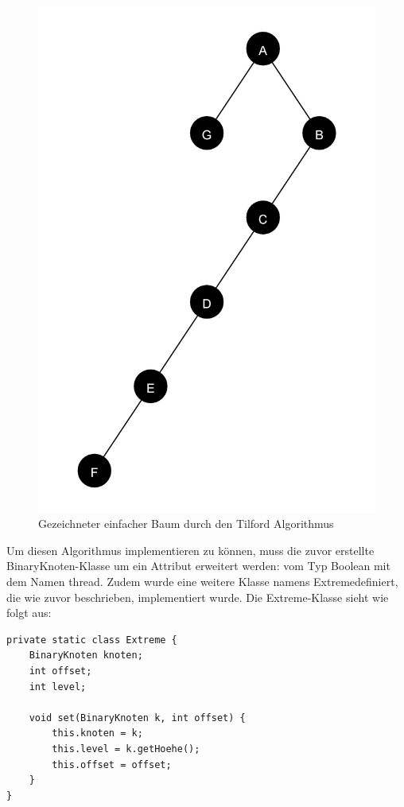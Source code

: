 \begin{figure}[H]
    \centering
    \includegraphics[scale = 0.07]{abbildungen/baum_algo_3_n2}
    \caption{Gezeichneter einfacher Baum durch den Tilford Algorithmus}
    \label{pic:baum_algo_3_n2} 
\end{figure}

Um diesen Algorithmus implementieren zu können, muss die zuvor erstellte BinaryKnoten-Klasse um ein 
Attribut erweitert werden: vom Typ Boolean mit dem Namen \glqq thread\grqq. Zudem wurde eine weitere Klasse 
namens \glqq Extreme\grqq definiert, die wie zuvor beschrieben, implementiert wurde. Die Extreme-Klasse sieht wie folgt aus:

\begin{lstlisting}[caption=Implementierung der Extreme-Klasse, label=code:algo3_extreme]
private static class Extreme {
    BinaryKnoten knoten;
    int offset;
    int level;
    
    void set(BinaryKnoten k, int offset) {
        this.knoten = k;
        this.level = k.getHoehe();
        this.offset = offset;
    }
}
\end{lstlisting}

